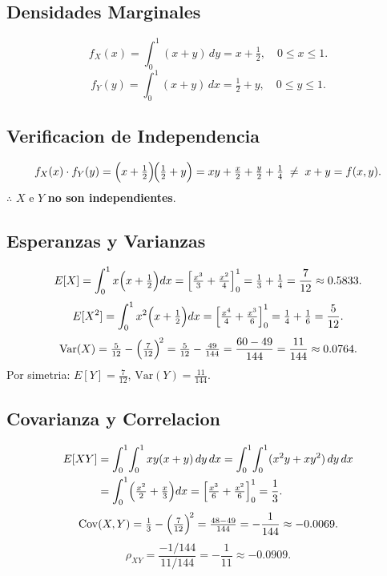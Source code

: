 \documentclass[12pt,a4paper]{article}
\begin{document}
\subsection{Densidades Marginales}

\[
  f_X(x)=\int_0^1(x+y)\,dy=x+\tfrac{1}{2},\quad 0\leq x\leq 1.
\]
\[
  f_Y(y)=\int_0^1(x+y)\,dx=\tfrac{1}{2}+y,\quad 0\leq y\leq 1.
\]

\subsection{Verificacion de Independencia}

\[
  f_X(x)\cdot f_Y(y)=\Bigl(x+\tfrac{1}{2}\Bigr)\!\Bigl(\tfrac{1}{2}+y\Bigr)
  =xy+\tfrac{x}{2}+\tfrac{y}{2}+\tfrac{1}{4}
  \;\neq\; x+y = f(x,y).
\]
$\therefore$ $X$ e $Y$ \textbf{no son independientes}.

\subsection{Esperanzas y Varianzas}

\[
  E[X]=\int_0^1 x\Bigl(x+\tfrac{1}{2}\Bigr)dx
      =\Bigl[\tfrac{x^3}{3}+\tfrac{x^2}{4}\Bigr]_0^1
      =\tfrac{1}{3}+\tfrac{1}{4}=\frac{7}{12}\approx 0.5833.
\]
\[
  E[X^2]=\int_0^1 x^2\Bigl(x+\tfrac{1}{2}\Bigr)dx
        =\Bigl[\tfrac{x^4}{4}+\tfrac{x^3}{6}\Bigr]_0^1
        =\tfrac{1}{4}+\tfrac{1}{6}=\frac{5}{12}.
\]
\[
  \mathrm{Var}(X)=\tfrac{5}{12}-\Bigl(\tfrac{7}{12}\Bigr)^{\!2}
                =\tfrac{5}{12}-\tfrac{49}{144}
                =\frac{60-49}{144}=\frac{11}{144}\approx 0.0764.
\]
Por simetria: $E[Y]=\tfrac{7}{12}$,\; $\mathrm{Var}(Y)=\tfrac{11}{144}$.

\subsection{Covarianza y Correlacion}

\begin{align*}
  E[XY]&=\int_0^1\!\int_0^1 xy(x+y)\,dy\,dx
         =\int_0^1\!\int_0^1(x^2y+xy^2)\,dy\,dx \\
       &=\int_0^1\Bigl(\tfrac{x^2}{2}+\tfrac{x}{3}\Bigr)dx
         =\Bigl[\tfrac{x^3}{6}+\tfrac{x^2}{6}\Bigr]_0^1
         =\frac{1}{3}.
\end{align*}
\[
  \mathrm{Cov}(X,Y)=\tfrac{1}{3}-\Bigl(\tfrac{7}{12}\Bigr)^{\!2}
                  =\tfrac{48-49}{144}=-\frac{1}{144}\approx -0.0069.
\]
\[
  \rho_{XY}=\frac{-1/144}{11/144}=-\frac{1}{11}\approx \mathbf{-0.0909}.
\]
\end{document}
